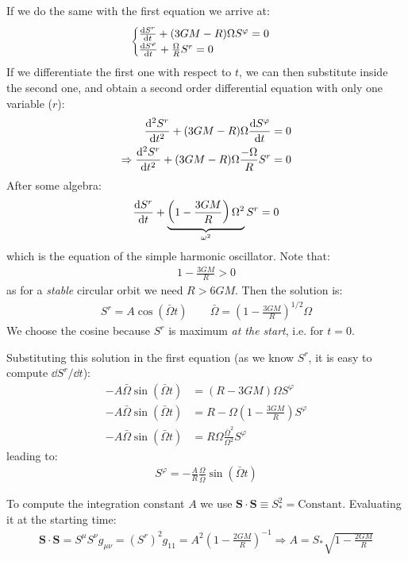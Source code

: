 \documentclass[../template.tex]{subfiles}
\begin{document}
If we do the same with the first equation we arrive at:
\begin{align*}
    \begin{cases}
        \dv{S^r}{t} + (3GM - R) \Omega S^\varphi = 0\\
        \dv{S^\varphi}{t} + \frac{\Omega}{R} S^r = 0 
    \end{cases}
\end{align*}
If we differentiate the first one with respect to $t$, we can then substitute inside the second one, and obtain a second order differential equation with only one variable ($r$):
\begin{align*}
    \dv[2]{S^r}{t} + (3GM - R) \Omega \dv{S^\varphi}{t} = 0\\
    \Rightarrow \dv[2]{S^r}{t} + (3GM - R) \Omega \frac{-\Omega}{R} S^r = 0 
\end{align*} 
After some algebra:
\begin{align*}
    \dv{S^r}{t} + \underbrace{\left(1-\frac{3GM}{R} \right)\Omega^2}_{\omega^2}  S^r = 0
\end{align*}
which is the equation of the simple harmonic oscillator. Note that:
\begin{align*}
    1-\frac{3GM}{R} > 0 
\end{align*}
as for a \textit{stable} circular orbit we need $R > 6GM$. Then the solution is:
\begin{align*}
    S^r = A \cos\left(\bar{\Omega} t\right) \qquad \bar{\Omega} = \left(1-\frac{3GM}{R} \right)^{1/2} \Omega
\end{align*}  
We choose the cosine because $S^r$ is maximum \textit{at the start}, i.e. for $t=0$. 

Substituting this solution in the first equation (as we know $S^r$, it is easy to compute $\dd{S^r}/\dd{t}$):
\begin{align*}
    -A \bar{\Omega} \sin(\bar{\Omega} t) &= (R-3GM) \Omega S^\varphi\\
    -A \bar{\Omega} \sin(\bar{\Omega} t) &= R - \Omega \left(1-\frac{3GM}{R} \right) S^{\varphi}\\
-A \bar{\Omega} \sin(\bar{\Omega} t) &= R \Omega \frac{\bar{\Omega}^2}{\Omega^2} S^\varphi  
\end{align*}
leading to:
\begin{align*}
    S^\varphi = -\frac{A}{R} \frac{\Omega}{\bar{\Omega}} \sin(\bar{\Omega} t)  
\end{align*}

To compute the integration constant $A$ we use $\bm{S} \cdot \bm{S} \equiv S_*^2 = \text{Constant}$. Evaluating it at the starting time:
\begin{align*}
    \bm{S}\cdot \bm{S} = S^\mu S^\nu g_{\mu \nu} = (S^r)^2 g_{11} = A^2 \left(1-\frac{2GM}{R} \right)^{-1} \Rightarrow A = S_* \sqrt{1-\frac{2GM}{R} }
\end{align*} 
\end{document}
